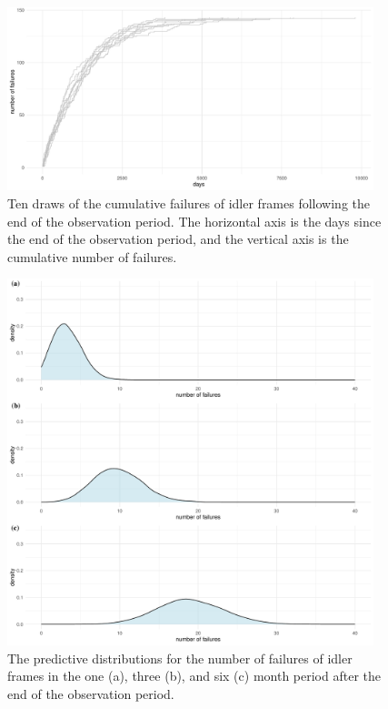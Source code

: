 \begin{figure}[tbp]
  \centering
  \includegraphics[width=0.95\textwidth]{./figures/ch-3/E-n-failures-draws.pdf}
  \caption{Ten draws of the cumulative failures of idler frames following the end of the observation period. The horizontal axis is the days since the end of the observation period, and the vertical axis is the cumulative number of failures.}
  \label{fig:E-Nfailrues-draws}
\end{figure}

\begin{figure}[tbp]
  \centering
  \includegraphics[width=0.95\textwidth]{./figures/ch-3/E-n-failures-densities.pdf}
  \caption{The predictive distributions for the number of failures of idler frames in the one (a), three (b), and six (c) month period after the end of the observation period.}
  \label{fig:E-Nfailrues-densities}
\end{figure}

